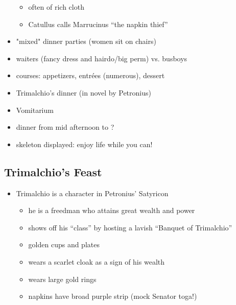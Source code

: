 \documentclass[12pt, twoside]{article}
\begin{document}
\begin{itemize}
	\begin{itemize}
	\item often of rich cloth
	\item Catullus calls Marrucinus “the napkin thief”
	\end{itemize}
\item "mixed" dinner parties (women sit on chairs)
\item waiters (fancy dress and hairdo/big perm) vs. busboys
\item courses: appetizers, entrées (numerous), dessert
\item Trimalchio's dinner (in novel by Petronius)
\item Vomitarium
\item dinner from mid afternoon to ?
\item skeleton displayed: enjoy life while you can!
\end{itemize}

\subsection{Trimalchio's Feast}
\begin{itemize}
\item Trimalchio is a character in Petronius’ Satyricon
	\begin{itemize}
	\item he is a freedman who attains great wealth and power
	\item shows off his “class” by hosting a lavish “Banquet of Trimalchio”
	\item golden cups and plates
	\item wears a scarlet cloak as a sign of his wealth
	\item wears large gold rings
	\item napkins have broad purple strip (mock Senator toga!)
	\end{itemize}
\end{itemize}
\end{document}
